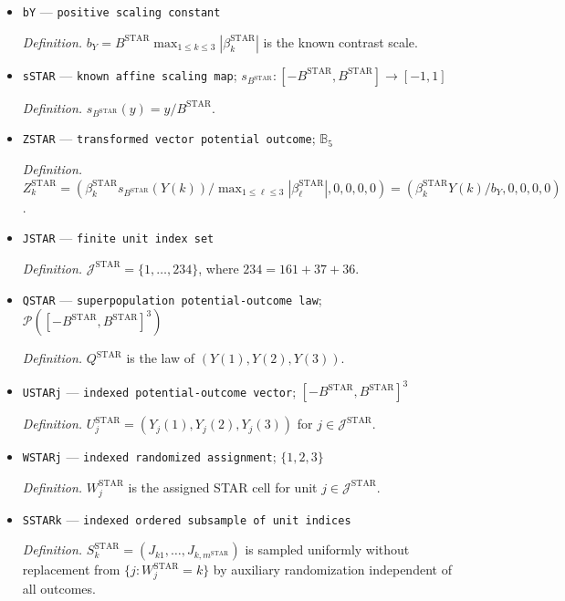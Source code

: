 \documentclass{article}
\begin{document}
\begin{itemize}
  \par\smallskip\noindent\emph{Definition.} \(Y(k)\) is the STAR outcome under cell \(k\in\{1,2,3\}\), with the known bound \(|Y(k)|\le B^{\mathrm{STAR}}\).
  \item \texttt{bY} --- \texttt{positive scaling constant}
  \par\smallskip\noindent\emph{Definition.} \(b_Y=B^{\mathrm{STAR}}\max_{1\le k\le3}|\beta_k^{\mathrm{STAR}}|\) is the known contrast scale.
  \item \texttt{sSTAR} --- \texttt{known affine scaling map}; \(s_{B^{\mathrm{STAR}}}:[-B^{\mathrm{STAR}},B^{\mathrm{STAR}}]\to[-1,1]\)
  \par\smallskip\noindent\emph{Definition.} \(s_{B^{\mathrm{STAR}}}(y)=y/B^{\mathrm{STAR}}\).
  \item \texttt{ZSTAR} --- \texttt{transformed vector potential outcome}; \(\mathbb B_5\)
  \par\smallskip\noindent\emph{Definition.} \(Z_k^{\mathrm{STAR}}=(\beta_k^{\mathrm{STAR}}s_{B^{\mathrm{STAR}}}(Y(k))/\max_{1\le\ell\le3}|\beta_\ell^{\mathrm{STAR}}|,0,0,0,0)=(\beta_k^{\mathrm{STAR}}Y(k)/b_Y,0,0,0,0)\).
  \item \texttt{JSTAR} --- \texttt{finite unit index set}
  \par\smallskip\noindent\emph{Definition.} \(\mathcal J^{\mathrm{STAR}}=\{1,\ldots,234\}\), where \(234=161+37+36\).
  \item \texttt{QSTAR} --- \texttt{superpopulation potential-\allowbreak{}outcome law}; \(\mathcal P([-B^{\mathrm{STAR}},B^{\mathrm{STAR}}]^3)\)
  \par\smallskip\noindent\emph{Definition.} \(Q^{\mathrm{STAR}}\) is the law of \((Y(1),Y(2),Y(3))\).
  \item \texttt{USTARj} --- \texttt{indexed potential-\allowbreak{}outcome vector}; \([-B^{\mathrm{STAR}},B^{\mathrm{STAR}}]^3\)
  \par\smallskip\noindent\emph{Definition.} \(U_j^{\mathrm{STAR}}=(Y_j(1),Y_j(2),Y_j(3))\) for \(j\in\mathcal J^{\mathrm{STAR}}\).
  \item \texttt{WSTARj} --- \texttt{indexed randomized assignment}; \(\{1,2,3\}\)
  \par\smallskip\noindent\emph{Definition.} \(W_j^{\mathrm{STAR}}\) is the assigned STAR cell for unit \(j\in\mathcal J^{\mathrm{STAR}}\).
  \item \texttt{SSTARk} --- \texttt{indexed ordered subsample of unit indices}
  \par\smallskip\noindent\emph{Definition.} \(S_k^{\mathrm{STAR}}=(J_{k1},\ldots,J_{k,m^{\mathrm{STAR}}})\) is sampled uniformly without replacement from \(\{j:W_j^{\mathrm{STAR}}=k\}\) by auxiliary randomization independent of all outcomes.

\end{itemize}
\end{document}
